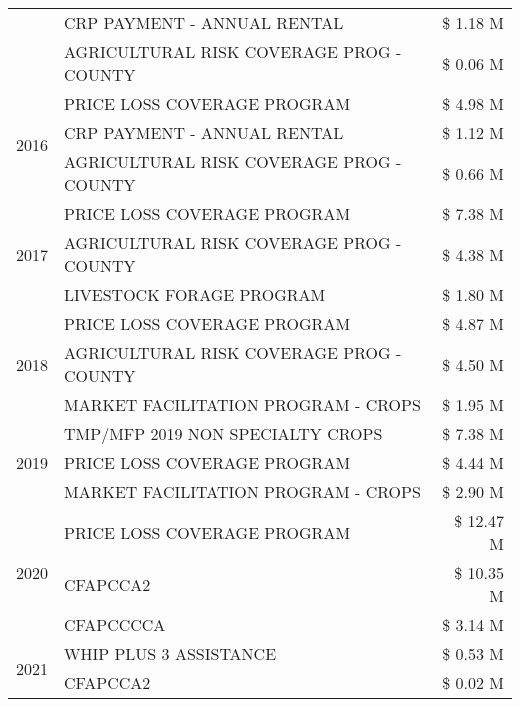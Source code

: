 \begin{tabular}{llr}
 & CRP PAYMENT - ANNUAL RENTAL & \$ 1.18 M \\
 & AGRICULTURAL RISK COVERAGE PROG - COUNTY & \$ 0.06 M \\
\cline{1-3}
\multirow[t]{3}{*}{2016} & PRICE LOSS COVERAGE PROGRAM & \$ 4.98 M \\
 & CRP PAYMENT - ANNUAL RENTAL & \$ 1.12 M \\
 & AGRICULTURAL RISK COVERAGE PROG - COUNTY & \$ 0.66 M \\
\cline{1-3}
\multirow[t]{3}{*}{2017} & PRICE LOSS COVERAGE PROGRAM & \$ 7.38 M \\
 & AGRICULTURAL RISK COVERAGE PROG - COUNTY & \$ 4.38 M \\
 & LIVESTOCK FORAGE PROGRAM & \$ 1.80 M \\
\cline{1-3}
\multirow[t]{3}{*}{2018} & PRICE LOSS COVERAGE PROGRAM & \$ 4.87 M \\
 & AGRICULTURAL RISK COVERAGE PROG - COUNTY & \$ 4.50 M \\
 & MARKET FACILITATION PROGRAM - CROPS & \$ 1.95 M \\
\cline{1-3}
\multirow[t]{3}{*}{2019} & TMP/MFP 2019 NON SPECIALTY CROPS & \$ 7.38 M \\
 & PRICE LOSS COVERAGE PROGRAM & \$ 4.44 M \\
 & MARKET FACILITATION PROGRAM - CROPS & \$ 2.90 M \\
\cline{1-3}
\multirow[t]{3}{*}{2020} & PRICE LOSS COVERAGE PROGRAM & \$ 12.47 M \\
 & CFAPCCA2 & \$ 10.35 M \\
 & CFAPCCCCA & \$ 3.14 M \\
\cline{1-3}
\multirow[t]{2}{*}{2021} & WHIP PLUS 3 ASSISTANCE & \$ 0.53 M \\
 & CFAPCCA2 & \$ 0.02 M \\
\cline{1-3}
\bottomrule
\end{tabular}
